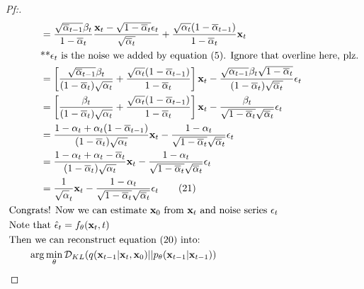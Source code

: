 \documentclass{article}
\begin{document}
\begin{proof}[\textit{Pf:}]
\begin{align}
        &\qquad\quad\, = \frac{\sqrt{\overline{\alpha}_{t-1}}\beta_t}{1-\overline{\alpha}_t}
        \frac{\mathbf{x}_t - \sqrt{1 - \overline{\alpha}_t} \epsilon_t}{\sqrt{\overline{\alpha}_t}}
            + \frac{\sqrt{\alpha_t}(1-\overline{\alpha}_{t-1})}{1-\overline{\alpha}_t}\mathbf{x}_t \notag\\
        &\qquad\quad\, \text{**}\epsilon_t \text{ is the noise we added by equation (5). Ignore that overline here, plz.} \notag \\
        &\qquad\quad\, = \left[ \frac{\sqrt{\overline{\alpha}_{t-1}}\beta_t}{(1-\overline{\alpha}_t)\sqrt{\alpha_{t}}} 
            + \frac{\sqrt{\alpha_t}(1-\overline{\alpha}_{t-1})}{1-\overline{\alpha}_t} \right] \mathbf{x}_t
            - \frac{\sqrt{\alpha_{t-1}}\beta_t\sqrt{1-\overline{\alpha}_t}}{(1-\overline{\alpha}_t)\sqrt{\overline{\alpha}_t}} \epsilon_t \notag \\
        &\qquad\quad\, = \left[ \frac{\beta_t}{(1-\overline{\alpha}_t)\sqrt{\alpha_t}}
            + \frac{\sqrt{\alpha_t}(1-\overline{\alpha}_{t-1})}{1-\overline{\alpha}_t} \right] \mathbf{x}_t
            - \frac{\beta_t}{\sqrt{1-\overline{\alpha}_t}\sqrt{\overline{\alpha}_{t}}} \epsilon_t \notag \\
        &\qquad\quad\, = \frac{1-\alpha_t + \alpha_t(1-\overline{\alpha}_{t-1})}{(1-\overline{\alpha}_t)\sqrt{\alpha_t}}\mathbf{x}_t
            - \frac{1 - \alpha_t}{\sqrt{1-\overline{\alpha}_t}\sqrt{\overline{\alpha}_{t}}} \epsilon_t \notag \\
        &\qquad\quad\, = \frac{1-\alpha_t + \alpha_t-\overline{\alpha}_t}{(1-\overline{\alpha}_t)\sqrt{\alpha_t}}\mathbf{x}_t
            - \frac{1 - \alpha_t}{\sqrt{1-\overline{\alpha}_t}\sqrt{\overline{\alpha}_{t}}} \epsilon_t \notag \\
        &\qquad\quad\, = \frac{1}{\sqrt{\alpha}_t}\mathbf{x}_t 
        - \frac{1 - \alpha_t}{\sqrt{1-\overline{\alpha}_t}\sqrt{\overline{\alpha}_{t}}} \epsilon_t \tag{21} \\
        &\text{Congrats! Now we can estimate }\mathbf{x}_0 \text{ from } \mathbf{x}_t \text{ and noise series } \epsilon_t  \notag \\
        &\text{Note that } \hat{\epsilon}_t = f_{\theta}(\mathbf{x}_t, t) \notag \\
        &\text{Then we can reconstruct equation (20) into: } \notag \\
        &\qquad\arg\min_{\theta} \mathcal{D}_{KL}(q(\mathbf{x}_{t-1}|\mathbf{x}_t, \mathbf{x}_0) || p_{\theta}(\mathbf{x}_{t-1}|\mathbf{x}_{t-1})) \notag \\

\end{align}
\end{proof}
\end{document}
